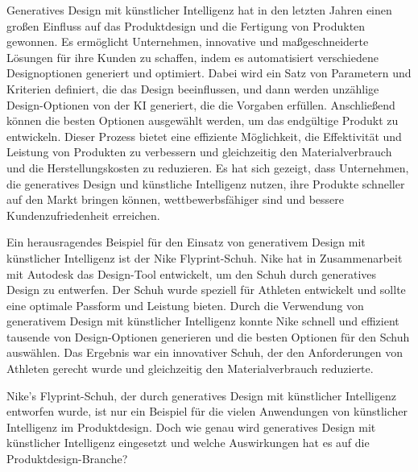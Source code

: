 Generatives Design mit künstlicher Intelligenz hat in den letzten Jahren einen großen Einfluss auf das Produktdesign und 
die Fertigung von Produkten gewonnen. Es ermöglicht Unternehmen, innovative und maßgeschneiderte Lösungen für ihre Kunden 
zu schaffen, indem es automatisiert verschiedene Designoptionen generiert und optimiert. Dabei wird ein Satz von Parametern 
und Kriterien definiert, die das Design beeinflussen, und dann werden unzählige Design-Optionen von der KI generiert, die die 
Vorgaben erfüllen. Anschließend können die besten Optionen ausgewählt werden, um das endgültige Produkt zu entwickeln.
Dieser Prozess bietet eine effiziente Möglichkeit, die Effektivität und Leistung von Produkten zu verbessern und gleichzeitig 
den Materialverbrauch und die Herstellungskosten zu reduzieren. Es hat sich gezeigt, dass Unternehmen, die generatives Design 
und künstliche Intelligenz nutzen, ihre Produkte schneller auf den Markt bringen können, wettbewerbsfähiger sind und bessere 
Kundenzufriedenheit erreichen.

Ein herausragendes Beispiel für den Einsatz von generativem Design mit künstlicher Intelligenz ist der Nike Flyprint-Schuh. 
Nike hat in Zusammenarbeit mit Autodesk das Design-Tool entwickelt, um den Schuh durch generatives Design zu entwerfen. Der 
Schuh wurde speziell für Athleten entwickelt und sollte eine optimale Passform und Leistung bieten. Durch die Verwendung von 
generativem Design mit künstlicher Intelligenz konnte Nike schnell und effizient tausende von Design-Optionen generieren und 
die besten Optionen für den Schuh auswählen. Das Ergebnis war ein innovativer Schuh, der den Anforderungen von Athleten gerecht
 wurde und gleichzeitig den Materialverbrauch reduzierte. 

Nike's Flyprint-Schuh, der durch generatives Design mit künstlicher Intelligenz entworfen wurde, ist nur ein Beispiel für die 
vielen Anwendungen von künstlicher Intelligenz im Produktdesign. Doch wie genau wird generatives Design mit künstlicher Intelligenz
eingesetzt und welche Auswirkungen hat es auf die Produktdesign-Branche?